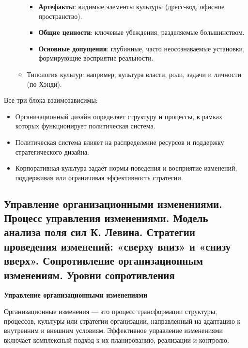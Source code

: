 \begin{enumerate}
\begin{itemize}
\begin{itemize}
                \item \textbf{Артефакты}: видимые элементы культуры (дресс-код, офисное пространство).
                \item \textbf{Общие ценности}: ключевые убеждения, разделяемые большинством.
                \item \textbf{Основные допущения}: глубинные, часто неосознаваемые установки, формирующие восприятие реальности.
            \end{itemize}
            \item Типология культур: например, культура власти, роли, задачи и личности (по Хэнди).
        \end{itemize}
\end{enumerate}

Все три блока взаимозависимы:
\begin{itemize}
    \item Организационный дизайн определяет структуру и процессы, в рамках которых функционирует политическая система.
    \item Политическая система влияет на распределение ресурсов и поддержку стратегического дизайна.
    \item Корпоративная культура задаёт нормы поведения и восприятие изменений, поддерживая или ограничивая эффективность стратегии.
\end{itemize}

\pagebreak
\subsection{Управление организационными изменениями. Процесс управления изменениями. Модель анализа поля сил К. Левина. Стратегии проведения изменений: «сверху вниз» и «снизу вверх». Сопротивление организационным изменениям. Уровни сопротивления}

\textbf{Управление организационными изменениями}

Организационные изменения --- это процесс трансформации структуры, процессов, культуры или стратегии организации, направленный на адаптацию к внутренним и внешним условиям. Эффективное управление изменениями включает комплексный подход к их планированию, реализации и контролю.

